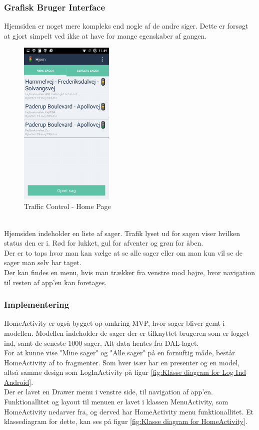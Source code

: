 	\subsubsection{Grafisk Bruger Interface}
	Hjemsiden er noget mere kompleks end nogle af de andre siger. Dette er forsøgt at gjort simpelt ved ikke at have for mange egenskaber af gangen.
	\begin{figure}[h!]
		\begin{center}
			\includegraphics[height=8cm]{Android/Billeder/AndroidHomePage}
		\end{center}
		\caption{Traffic Control - Home Page}
		\label{fig: Traffic Control - Home Page}
	\end{figure}
	\\
	Hjemsiden indeholder en liste af sager. Trafik lyset ud for sagen viser hvilken status den er i. Rød for lukket, gul for afventer og grøn for åben. \\
	Der er to taps hvor man kan vælge at se alle sager eller om man kun vil se de sager man selv har taget.
	\\Der kan findes en menu, hvis man trækker fra venstre mod højre, hvor navigation til resten af app'en kan foretages.
	
	
	\subsubsection{Implementering} \label{HomePageImp}
	HomeActivity er også bygget op omkring MVP, hvor sager bliver gemt i modellen. Modellen indeholder de sager der er tilknyttet brugeren som er logget ind, samt de seneste 1000 sager. Alt data hentes fra DAL-laget.
	\\For at kunne vise "Mine sager" og "Alle sager" på en fornuftig måde, består HomeActivity af to fragmenter. Som hver især har en presenter og en model, altså samme design som LogInActivity på figur \vref{fig:Klasse diagram for Log Ind Android}.
	\\Der er lavet en Drawer menu i venstre side, til navigation af app'en. Funktionallitet og layout til menuen er lavet i klassen MenuActivity, som HomeActivity nedarver fra, og derved har HomeActivity menu funktionallitet.
	Et klassediagram for dette, kan ses på figur \vref{fig:Klasse diagram for HomeActivity}.
	 
	\pagebreak